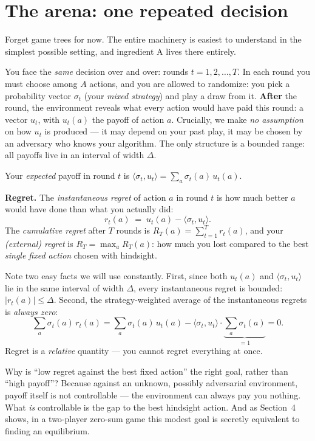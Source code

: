 \documentclass[11pt,a4paper]{article}
\begin{document}
\section{The arena: one repeated decision}

Forget game trees for now. The entire machinery is easiest to understand in
the simplest possible setting, and ingredient A lives there entirely.

You face the \emph{same} decision over and over: rounds $t = 1, 2, \dots, T$.
In each round you must choose among $A$ actions, and you are allowed to
randomize: you pick a probability vector $\sigma_t$ (your \emph{mixed
strategy}) and play a draw from it. \textbf{After} the round, the environment
reveals what every action would have paid this round: a vector $u_t$, with
$u_t(a)$ the payoff of action $a$. Crucially, we make \emph{no assumption} on
how $u_t$ is produced --- it may depend on your past play, it may be chosen by
an adversary who knows your algorithm. The only structure is a bounded range:
all payoffs live in an interval of width $\Delta$.

Your \emph{expected} payoff in round $t$ is
$\langle\sigma_t, u_t\rangle = \sum_a \sigma_t(a)\,u_t(a)$.

\begin{defbox}
\textbf{Regret.} The \emph{instantaneous regret} of action $a$ in round $t$
is how much better $a$ would have done than what you actually did:
\[
r_t(a) \;=\; u_t(a) - \langle\sigma_t, u_t\rangle .
\]
The \emph{cumulative regret} after $T$ rounds is
$R_T(a) = \sum_{t=1}^{T} r_t(a)$, and your \emph{(external) regret} is
$R_T = \max_a R_T(a)$: how much you lost compared to the best
\emph{single fixed action} chosen with hindsight.
\end{defbox}

Note two easy facts we will use constantly. First, since both $u_t(a)$ and
$\langle\sigma_t,u_t\rangle$ lie in the same interval of width $\Delta$,
every instantaneous regret is bounded: $|r_t(a)| \le \Delta$. Second, the
strategy-weighted average of the instantaneous regrets is \emph{always zero}:
\[
\sum_a \sigma_t(a)\, r_t(a)
 = \sum_a \sigma_t(a)\,u_t(a) - \langle\sigma_t,u_t\rangle \cdot \underbrace{\textstyle\sum_a \sigma_t(a)}_{=1} = 0 .
\]
Regret is a \emph{relative} quantity --- you cannot regret everything at once.

\begin{intuition}
Why is ``low regret against the best fixed action'' the right goal, rather
than ``high payoff''? Because against an unknown, possibly adversarial
environment, payoff itself is not controllable --- the environment can always
pay you nothing. What \emph{is} controllable is the gap to the best hindsight
action. And as Section~4 shows, in a two-player zero-sum game this modest
goal is secretly equivalent to finding an equilibrium.
\end{intuition}
\end{document}
